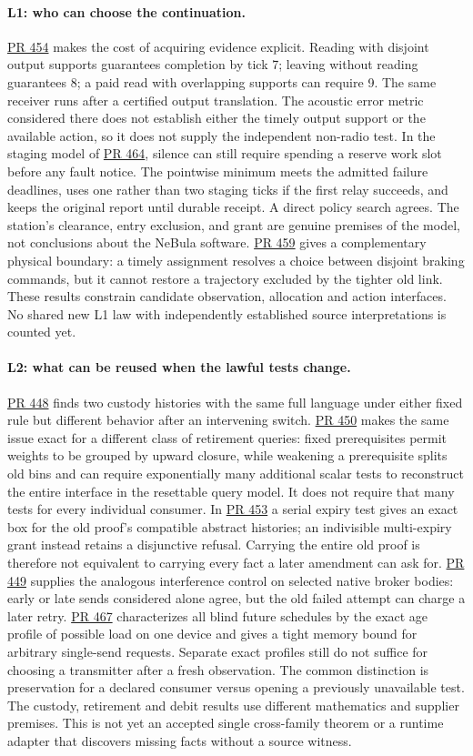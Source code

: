 \documentclass[11pt]{article}
\newcommand{\pr}[1]{\href{https://github.com/eternal-november/eos-research-programmes/pull/#1}{PR #1}}
\begin{document}
\paragraph{L1: who can choose the continuation.}
\pr{454} makes the cost of acquiring evidence explicit. Reading with disjoint output supports guarantees completion by tick 7; leaving without reading guarantees 8; a paid read with overlapping supports can require 9. The same receiver runs after a certified output translation. The acoustic error metric considered there does not establish either the timely output support or the available action, so it does not supply the independent non-radio test. In the staging model of \pr{464}, silence can still require spending a reserve work slot before any fault notice. The pointwise minimum meets the admitted failure deadlines, uses one rather than two staging ticks if the first relay succeeds, and keeps the original report until durable receipt. A direct policy search agrees. The station's clearance, entry exclusion, and grant are genuine premises of the model, not conclusions about the NeBula software. \pr{459} gives a complementary physical boundary: a timely assignment resolves a choice between disjoint braking commands, but it cannot restore a trajectory excluded by the tighter old link. These results constrain candidate observation, allocation and action interfaces. No shared new L1 law with independently established source interpretations is counted yet.

\paragraph{L2: what can be reused when the lawful tests change.}
\pr{448} finds two custody histories with the same full language under either fixed rule but different behavior after an intervening switch. \pr{450} makes the same issue exact for a different class of retirement queries: fixed prerequisites permit weights to be grouped by upward closure, while weakening a prerequisite splits old bins and can require exponentially many additional scalar tests to reconstruct the entire interface in the resettable query model. It does not require that many tests for every individual consumer. In \pr{453} a serial expiry test gives an exact box for the old proof's compatible abstract histories; an indivisible multi-expiry grant instead retains a disjunctive refusal. Carrying the entire old proof is therefore not equivalent to carrying every fact a later amendment can ask for. \pr{449} supplies the analogous interference control on selected native broker bodies: early or late sends considered alone agree, but the old failed attempt can charge a later retry. \pr{467} characterizes all blind future schedules by the exact age profile of possible load on one device and gives a tight memory bound for arbitrary single-send requests. Separate exact profiles still do not suffice for choosing a transmitter after a fresh observation. The common distinction is preservation for a declared consumer versus opening a previously unavailable test. The custody, retirement and debit results use different mathematics and supplier premises. This is not yet an accepted single cross-family theorem or a runtime adapter that discovers missing facts without a source witness.
\end{document}
